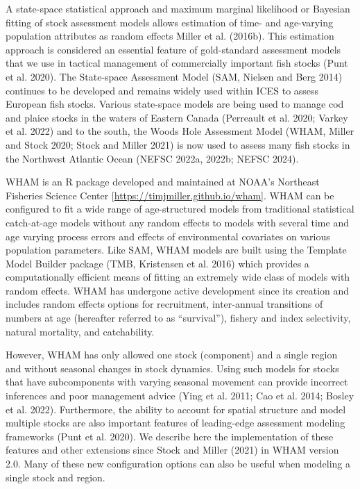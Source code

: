 \documentclass[
]{article}
\begin{document}
A state-space statistical approach and maximum marginal likelihood or
Bayesian fitting of stock assessment models allows estimation of time-
and age-varying population attributes as random effects Miller et al.
(2016b). This estimation approach is considered an essential feature of
gold-standard assessment models that we use in tactical management of
commercially important fish stocks (Punt et al. 2020). The State-space
Assessment Model (SAM, Nielsen and Berg 2014) continues to be developed
and remains widely used within ICES to assess European fish stocks.
Various state-space models are being used to manage cod and plaice
stocks in the waters of Eastern Canada (Perreault et al. 2020; Varkey et
al. 2022) and to the south, the Woods Hole Assessment Model (WHAM,
Miller and Stock 2020; Stock and Miller 2021) is now used to assess many
fish stocks in the Northwest Atlantic Ocean (NEFSC 2022a, 2022b; NEFSC
2024).

WHAM is an R package developed and maintained at NOAA's Northeast
Fisheries Science Center {[}\url{https://timjmiller.github.io/wham}{]}.
WHAM can be configured to fit a wide range of age-structured models from
traditional statistical catch-at-age models without any random effects
to models with several time and age varying process errors and effects
of environmental covariates on various population parameters. Like SAM,
WHAM models are built using the Template Model Builder package (TMB,
Kristensen et al. 2016) which provides a computationally efficient means
of fitting an extremely wide class of models with random effects. WHAM
has undergone active development since its creation and includes random
effects options for recruitment, inter-annual transitions of numbers at
age (hereafter referred to as ``survival''), fishery and index
selectivity, natural mortality, and catchability.

However, WHAM has only allowed one stock (component) and a single region
and without seasonal changes in stock dynamics. Using such models for
stocks that have subcomponents with varying seasonal movement can
provide incorrect inferences and poor management advice (Ying et al.
2011; Cao et al. 2014; Bosley et al. 2022). Furthermore, the ability to
account for spatial structure and model multiple stocks are also
important features of leading-edge assessment modeling frameworks (Punt
et al. 2020). We describe here the implementation of these features and
other extensions since Stock and Miller (2021) in WHAM version 2.0. Many
of these new configuration options can also be useful when modeling a
single stock and region.
\end{document}
